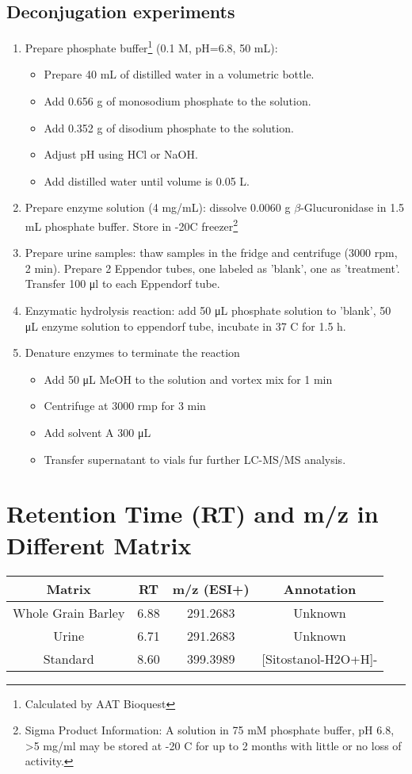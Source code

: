 \subsection{Deconjugation experiments}
\begin{enumerate}
\item Prepare phosphate buffer\footnote{Calculated by AAT Bioquest} (0.1 M, pH=6.8, 50 mL): 
	\begin{itemize}
		\item Prepare 40 mL of distilled water in a volumetric bottle.
		\item Add 0.656 g of monosodium phosphate to the solution.
		\item Add 0.352 g of disodium phosphate to the solution.
		\item Adjust pH using HCl or NaOH.
		\item Add distilled water until volume is 0.05 L.
	\end{itemize}

\item Prepare enzyme solution (4 mg/mL): dissolve 0.0060 g $\beta$-Glucuronidase in 1.5 mL phosphate buffer. Store in -20\degree C freezer\footnote{Sigma Product Information: A solution in 75 mM phosphate buffer, pH 6.8, \textgreater 5 mg/ml may be stored at -20 \degree C for up to 2 months with little or no loss of activity.}
\item Prepare urine samples: thaw samples in the fridge and centrifuge (3000 rpm, 2 min). Prepare 2 Eppendor tubes, one labeled as 'blank', one as 'treatment'. Transfer 100 \si{\micro\litre} to each Eppendorf tube.
\item Enzymatic hydrolysis reaction: add 50 \si{\micro\liter} phosphate solution to 'blank', 50 \si{\micro\liter} enzyme solution to eppendorf tube, incubate in 37 \degree C for 1.5 h.
\item Denature enzymes to terminate the reaction
	\begin{itemize}
	\item Add 50 \si{\micro\liter} MeOH to the solution and vortex mix for 1 min
	\item Centrifuge at 3000 rmp for 3 min
	\item Add solvent A 300 \si{\micro\liter}
	\item Transfer supernatant to vials fur further LC-MS/MS analysis.
\end{itemize}


\end{enumerate}


\section{Retention Time (RT) and m/z in Different Matrix}
\begin{tabular}{|c|c|c|c|}
	\hline 
	Matrix & RT & m/z (ESI+) & Annotation \\ 
	\hline 
	Whole Grain Barley & 6.88 & 291.2683 & Unknown \\ 
	\hline 
	Urine & 6.71 & 291.2683 & Unknown \\ 
	\hline 
	Standard & 8.60 & 399.3989 & [Sitostanol-H2O+H]- \\ 
	\hline 
\end{tabular} 